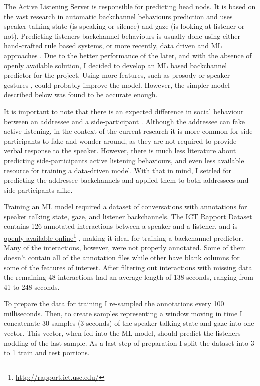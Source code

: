 \documentclass[]{simple-thesis}
\newcommand\fnurl[2]{%
  \href{#2}{#1}\footnote{\url{#2}}%
}
\begin{document}
The Active Listening Server is responsible for predicting head nods.
It is based on the vast research in automatic backchannel behaviours prediction and uses speaker talking state (is speaking or silence) and gaze (is looking at listener or not).
Predicting listeners backchannel behaviours is usually done using either hand-crafted rule based systems, or more recently, data driven and ML approaches \citep{Morency2008}.
Due to the better performance of the later, and with the absence of openly available solution, I decided to develop an ML based backchannel predictor for the project.
Using more features, such as prosody \citep{Ward2000} or speaker gestures \citep{Gratch2006}, could probably improve the model.
However, the simpler model described below was found to be accurate enough.

It is important to note that there is an expected difference in social behaviour between an addressee and a side-participant \citep{Clark1982}.
Although the addressee can fake active listening, in the context of the current research it is more common for side-participants to fake and wonder around, as they are not required to provide verbal response to the speaker.
However, there is much less literature about predicting side-participants active listening behaviours, and even less available resource for training a data-driven model.
With that in mind, I settled for predicting the addressee backchannels and applied them to both addressees and side-participants alike.

Training an ML model required a dataset of conversations with annotations for speaker talking state, gaze, and listener backchannels.
The ICT Rapport Dataset \citep{Gratch2007} contains 126 annotated interactions between a speaker and a listener, and is \fnurl{openly available online}{http://rapport.ict.usc.edu/}, making it ideal for training a backchannel predictor.
Many of the interactions, however, were not properly annotated.
Some of them doesn't contain all of the annotation files while other have blank columns for some of the features of interest.
After filtering out interactions with missing data the remaining 48 interactions had an average length of 138 seconds, ranging from 41 to 248 seconds.

To prepare the data for training I re-sampled the annotations every 100 milliseconds.
Then, to create samples representing a window moving in time I concatenate 30 samples (3 seconds) of the speaker talking state and gaze into one vector.
This vector, when fed into the ML model, should predict the listeners nodding of the last sample.
As a last step of preparation I split the dataset into 3 to 1 train and test portions.
\end{document}
